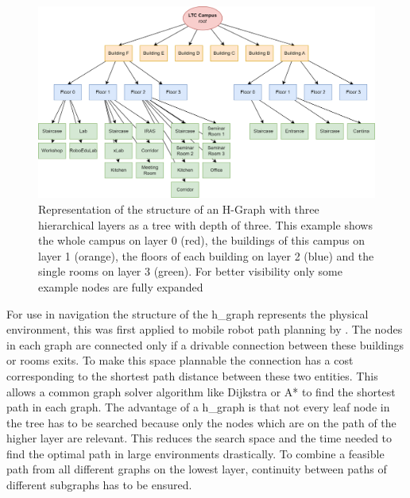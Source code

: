 \begin{figure}[h]
    \centering
    \includegraphics[width=\textwidth]{figures/20_state_of_the_art/hierarchical_graph.png}
    \caption[Representation of the structure of an H-Graph as tree]{Representation of the structure of an H-Graph with three hierarchical layers as a tree with depth of three. This example shows the whole campus on layer 0 (red), the buildings of this campus on layer 1 (orange), the floors of each building on layer 2 (blue) and the single rooms on layer 3 (green). For better visibility only some example nodes are fully expanded}
    \label{fig:h_graph}
\end{figure}

For use in navigation the structure of the \gls{h_graph} represents the physical environment, this was first applied to mobile robot path planning by \cite{fernandez_hierarchical_1998} \cite{fernandez-madrigal_multi-hierarchical_2001}. The nodes in each graph are connected only if a drivable connection between these buildings or rooms exits. To make this space plannable the connection has a cost corresponding to the shortest path distance between these two entities. This allows a common graph solver algorithm like Dijkstra or A* to find the shortest path in each graph. The advantage of a \gls{h_graph} is that not every leaf node in the tree has to be searched because only the nodes which are on the path of the higher layer are relevant. This reduces the search space and the time needed to find the optimal path in large environments drastically. To combine a feasible path from all different graphs on the lowest layer, continuity between paths of different subgraphs has to be ensured.

